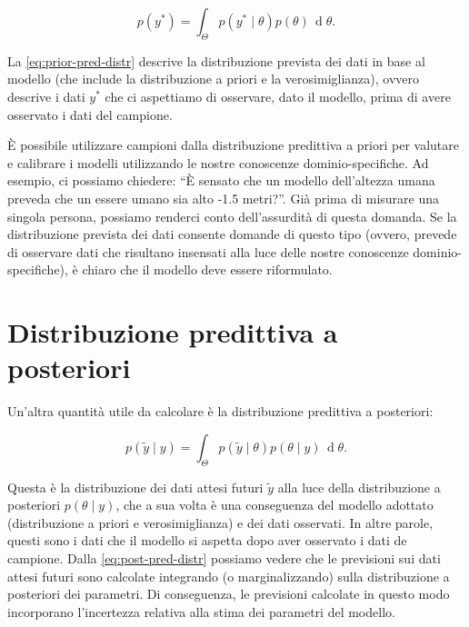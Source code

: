 \documentclass[
  11pt,
]{krantz}
\theoremstyle{definition}
\theoremstyle{definition}
\theoremstyle{definition}
\theoremstyle{definition}
\theoremstyle{remark}
\begin{document}
\begin{equation}
p(y^*) = \int_\Theta p(y^* \mid \theta) p(\theta) \,\operatorname {d}\!\theta .
\label{eq:prior-pred-distr}
\end{equation}

La \eqref{eq:prior-pred-distr} descrive la distribuzione prevista dei dati in base al modello (che include la distribuzione a priori e la verosimiglianza), ovvero descrive i dati \(y^*\) che ci aspettiamo di osservare, dato il modello, prima di avere osservato i dati del campione.

È possibile utilizzare campioni dalla distribuzione predittiva a priori per valutare e calibrare i modelli utilizzando le nostre conoscenze dominio-specifiche. Ad esempio, ci possiamo chiedere: ``È sensato che un modello dell'altezza umana preveda che un essere umano sia alto -1.5 metri?''. Già prima di misurare una singola persona, possiamo renderci conto dell'assurdità di questa domanda. Se la distribuzione prevista dei dati consente domande di questo tipo (ovvero, prevede di osservare dati che risultano insensati alla luce delle nostre conoscenze dominio-specifiche), è chiaro che il modello deve essere riformulato.

\hypertarget{distribuzione-predittiva-a-posteriori}{%
\section{Distribuzione predittiva a posteriori}\label{distribuzione-predittiva-a-posteriori}}

Un'altra quantità utile da calcolare è la distribuzione predittiva a posteriori:

\begin{equation}
p(\tilde{y} \mid y) = \int_\Theta p(\tilde{y} \mid \theta) p(\theta \mid y) \,\operatorname {d}\!\theta .
\label{eq:post-pred-distr}
\end{equation}

Questa è la distribuzione dei dati attesi futuri \(\tilde{y}\) alla luce della distribuzione a posteriori \(p(\theta \mid y)\), che a sua volta è una conseguenza del modello adottato (distribuzione a priori e verosimiglianza) e dei dati osservati. In altre parole, questi sono i dati che il modello si aspetta dopo aver osservato i dati de campione. Dalla \eqref{eq:post-pred-distr} possiamo vedere che le previsioni sui dati attesi futuri sono calcolate integrando (o marginalizzando) sulla distribuzione a posteriori dei parametri. Di conseguenza, le previsioni calcolate in questo modo incorporano l'incertezza relativa alla stima dei parametri del modello.
\end{document}
